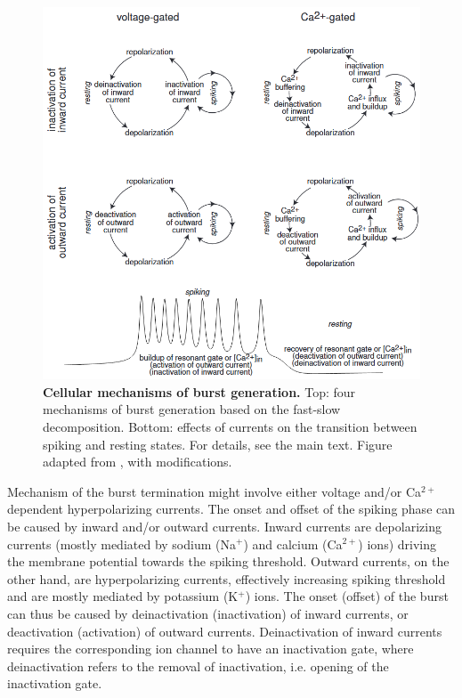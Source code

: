\documentclass[../main.tex]{subfiles}
\begin{document}
\begin{figure}[!t]
    \centering
    \includegraphics[width=0.85\linewidth]{../img/modeling_r5/examples/bursting_ionic_basis.png}
    \caption[Cellular mechanisms of burst generation]{
        \textbf{Cellular mechanisms of burst generation.}
        Top: four mechanisms of burst generation based on the fast-slow decomposition. Bottom: effects of currents on the transition between spiking and resting states.
        For details, see the main text.
        Figure adapted from \parencite{izhikevichDynamicalSystemsNeuroscience2006}, with modifications.
    }
    \label{fig:ionic_basis_for_slow_fast_bursting}
\end{figure}

Mechanism of the burst termination might involve either voltage and/or Ca$^{2+}$ dependent hyperpolarizing currents.
The onset and offset of the spiking phase can be caused by inward and/or outward currents. Inward currents are depolarizing currents (mostly mediated by sodium (Na$^+$) and calcium (Ca$^{2+}$) ions) driving the membrane potential towards the spiking threshold. Outward currents, on the other hand, are hyperpolarizing currents, effectively increasing spiking threshold and are mostly mediated by potassium (K$^+$) ions.
The onset (offset) of the burst can thus be caused by deinactivation (inactivation) of inward currents, or deactivation (activation) of outward currents. Deinactivation of inward currents requires the corresponding ion channel to have an inactivation gate, where deinactivation refers to the removal of inactivation, i.e. opening of the inactivation gate.
\end{document}
